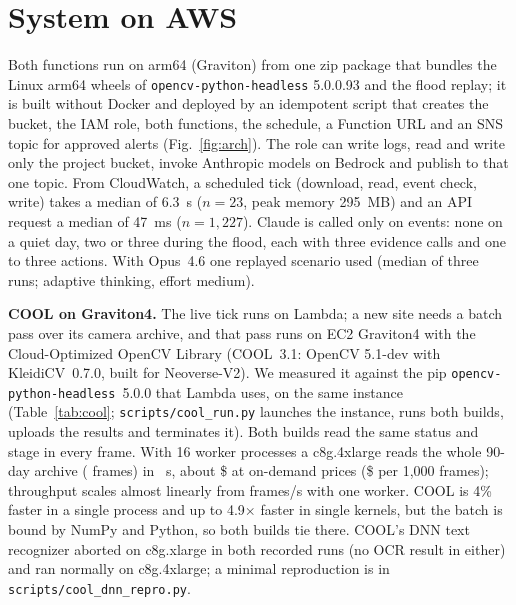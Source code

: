 \documentclass[conference,10pt,letterpaper]{IEEEtran}
\begin{document}
\section{System on AWS}
Both functions run on arm64 (Graviton) from one zip package that bundles the Linux arm64 wheels
of \texttt{opencv-python-headless} 5.0.0.93 and the flood replay; it is built without Docker and
deployed by an idempotent script that creates the bucket, the IAM role, both functions, the
schedule, a Function URL and an SNS topic for approved alerts (Fig.~\ref{fig:arch}). The role can
write logs, read and write only the project bucket, invoke Anthropic models on Bedrock and publish
to that one topic. From CloudWatch, a scheduled tick (download,
read, event check, write) takes a median of 6.3~s ($n=23$, peak memory 295~MB) and an API
request a median of 47~ms ($n=1{,}227$). Claude is called only on events: none on a quiet day,
two or three during the flood, each with three evidence calls and one to three actions. With
Opus~4.6 one replayed scenario used \AgentTokens{} (median of three runs; adaptive thinking,
effort medium).

\textbf{COOL on Graviton4.} The live tick runs on Lambda; a new site needs a batch pass over its
camera archive, and that pass runs on EC2 Graviton4 with the Cloud-Optimized OpenCV Library (COOL~3.1:
OpenCV 5.1-dev with KleidiCV~0.7.0, built for Neoverse-V2). We measured it against the pip
\texttt{opencv-python-headless}~5.0.0 that Lambda uses, on the same instance (Table~\ref{tab:cool};
\texttt{scripts/cool\_run.py} launches the instance, runs both builds, uploads the results and
terminates it). Both builds read the same status and stage in every frame. With 16 worker processes a
c8g.4xlarge reads the whole 90-day archive (\BatchFrames{} frames) in \BatchSeconds~s, about
\$\CostArchive{} at on-demand prices (\$\CostPerK{} per 1,000 frames); throughput scales almost
linearly from \BatchOne{} frames/s with one worker. COOL is 4\% faster in a single process and up to
4.9$\times$ faster in single kernels, but the batch is bound by NumPy and Python, so both builds tie
there. COOL's DNN text recognizer aborted on c8g.xlarge in both recorded runs (no OCR result in either)
and ran normally on c8g.4xlarge; a minimal reproduction is in \texttt{scripts/cool\_dnn\_repro.py}.
\end{document}
